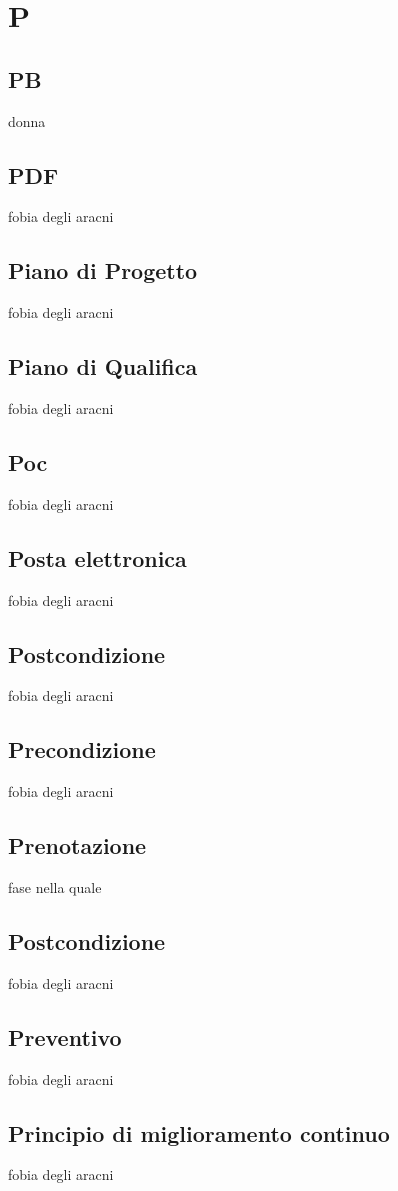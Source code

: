 \section{P} 
\subsection{PB} 
donna
\subsection{PDF} 
fobia degli aracni
\subsection{Piano di Progetto} 
fobia degli aracni
\subsection{Piano di Qualifica} 
fobia degli aracni
\subsection{Poc} 
fobia degli aracni
\subsection{Posta elettronica} 
fobia degli aracni
\subsection{Postcondizione} 
fobia degli aracni
\subsection{Precondizione} 
fobia degli aracni
\subsection{Prenotazione} 
fase nella quale
\subsection{Postcondizione} 
fobia degli aracni
\subsection{Preventivo} 
fobia degli aracni
\subsection{Principio di miglioramento continuo} 
fobia degli aracni
